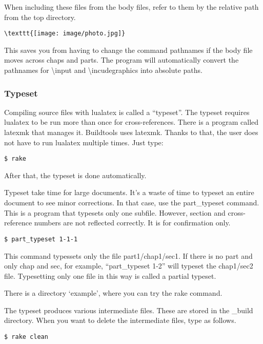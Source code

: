 \documentclass[
]{article}
\begin{document}
When including these files from the body files, refer to them by the
relative path from the top directory.

\begin{verbatim}
\texttt{[image: image/photo.jpg]}
\end{verbatim}

This saves you from having to change the command pathnames if the body
file moves across chaps and parts. The program will automatically
convert the pathnames for \textbackslash input and
\textbackslash incudegraphics into absolute paths.

\hypertarget{typeset}{%
\subsubsection{Typeset}\label{typeset}}

Compiling source files with lualatex is called a ``typeset''. The
typeset requires lualatex to be run more than once for cross-references.
There is a program called latexmk that manages it. Buildtools uses
latexmk. Thanks to that, the user does not have to run lualatex multiple
times. Just type:

\begin{verbatim}
$ rake
\end{verbatim}

After that, the typeset is done automatically.

Typeset take time for large documents. It's a waste of time to typeset
an entire document to see minor corrections. In that case, use the
part\_typeset command. This is a program that typesets only one subfile.
However, section and cross-reference numbers are not reflected
correctly. It is for confirmation only.

\begin{verbatim}
$ part_typeset 1-1-1
\end{verbatim}

This command typessets only the file part1/chap1/sec1. If there is no
part and only chap and sec, for example, ``part\_typeset 1-2'' will
typeset the chap1/sec2 file. Typesetting only one file in this way is
called a partial typeset.

There is a directory `example', where you can try the rake command.

The typeset produces various intermediate files. These are stored in the
\_build directory. When you want to delete the intermediate files, type
as follows.

\begin{verbatim}
$ rake clean
\end{verbatim}
\end{document}
